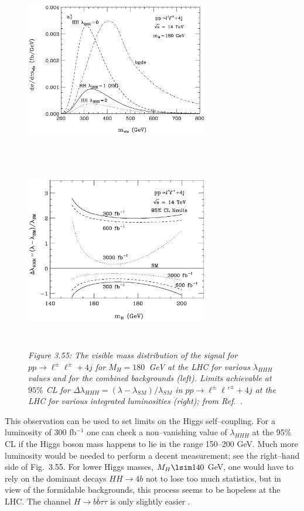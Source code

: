 \begin{figure}[!h] 
\vspace*{2mm}
\begin{center}
\includegraphics[width=8cm,height=8cm]{./sm3/gg-HH-LHC-bkgs.ps} 
\includegraphics[width=8cm,height=8cm]{./sm3/gg-HH-LHC-lambda.ps} 
\vspace*{-2mm}
\end{center}
{\it Figure 3.55: 
The visible mass distribution of the signal for $pp\to \ell^\pm{\ell}^\pm+4j$ 
for $M_H=180$~GeV at the LHC for various $\lambda_{HHH}$ values 
and for the combined backgrounds (left). Limits achievable at $95\%$ CL for 
$\Delta\lambda_{HHH}=(\lambda-\lambda_{SM})/\lambda_{SM}$ in $pp\to\ell^\pm{
\ell'}^\pm+4j$ at the LHC for various integrated luminosities (right); 
from Ref.~\cite{HHH-WW}.}
\vspace{-2mm}
\end{figure}

This observation can be used to set limits on the Higgs self--coupling. For a
luminosity of 300 fb$^{-1}$ one can check a non--vanishing value of
$\lambda_{HHH}$ at the 95\% CL if the Higgs boson mass happens to lie in the
range 150--200 GeV.  Much more luminosity would be needed to perform a decent
measurement; see the right--hand side of Fig.~3.55.  For lower Higgs masses,
$M_H \lsim 140$ GeV, one would have to rely on the dominant decays $ HH\to 4b$
not to lose too much statistics, but in view of the formidable backgrounds,
this process seems to be hopeless at the LHC. The channel $H \to b\bar b
\tau \tau$ is only slightly easier \cite{HHH-bb}.  

